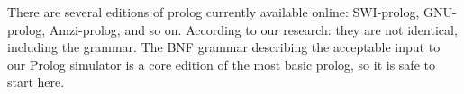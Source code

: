 There are several editions of prolog currently available online: SWI-prolog\cite{swi}, GNU-prolog\cite{gprolog}, Amzi-prolog\cite{amzi}, and so on. According to our research: they are not identical, including the grammar. The BNF grammar describing the acceptable input to our Prolog simulator is a core edition\cite{prologBNF} of the most basic prolog, so it is safe to start here.
